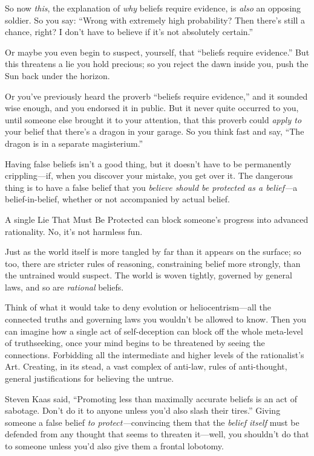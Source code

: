 {
 So now \textit{this}, the explanation of \textit{why} beliefs
require evidence, is \textit{also} an opposing soldier. So you say:
``Wrong with extremely high probability? Then
there's still a chance, right? I don't
have to believe if it's not absolutely
certain.''}

{
 Or maybe you even begin to suspect, yourself, that
``beliefs require evidence.'' But
this threatens a lie you hold precious; so you reject the dawn inside
you, push the Sun back under the horizon.}

{
 Or you've previously heard the proverb
``beliefs require evidence,'' and it
sounded wise enough, and you endorsed it in public. But it never quite
occurred to you, until someone else brought it to your attention, that
this proverb could \textit{apply to} your belief that
there's a dragon in your garage. So you think fast and
say, ``The dragon is in a separate
magisterium.''}

{
 Having false beliefs isn't a good thing, but it
doesn't have to be permanently crippling---if, when you
discover your mistake, you get over it. The dangerous thing is to have
a false belief that you \textit{believe should be protected as a
belief---}a belief-in-belief, whether or not accompanied by actual
belief.}

{
 A single Lie That Must Be Protected can block
someone's progress into advanced rationality. No,
it's not harmless fun.}

{
 Just as the world itself is more tangled by far than it appears on
the surface; so too, there are stricter rules of reasoning,
constraining belief more strongly, than the untrained would suspect.
The world is woven tightly, governed by general laws, and so are
\textit{rational} beliefs.}

{
 Think of what it would take to deny evolution or
heliocentrism---all the connected truths and governing laws you
wouldn't be allowed to know. Then you can imagine how a
single act of self-deception can block off the whole meta-level of
truthseeking, once your mind begins to be threatened by seeing the
connections. Forbidding all the intermediate and higher levels of the
rationalist's Art. Creating, in its stead, a vast
complex of anti-law, rules of anti-thought, general justifications for
believing the untrue.}

{
 Steven Kaas said, ``Promoting less than maximally
accurate beliefs is an act of sabotage. Don't do it to
anyone unless you'd also slash their
tires.'' Giving someone a false belief \textit{to
protect---}convincing them that the \textit{belief itself} must be
defended from any thought that seems to threaten it---well, you
shouldn't do that to someone unless
you'd also give them a frontal lobotomy.}

